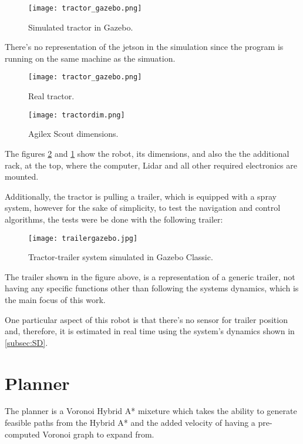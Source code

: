 \begin{figure}[h]
    \centering
    \texttt{[image: tractor\_gazebo.png]}
    \caption{Simulated tractor in Gazebo.}
\end{figure}

There's no representation of the jetson in the simulation since the program is running on 
the same machine as the simuation.
\begin{figure}[h]
    \centering
    \texttt{[image: tractor\_gazebo.png]}
    \caption{Real tractor.}
    \label{fig:tractor}
\end{figure}

 
\begin{figure}[h]
    \centering
    \texttt{[image: tractordim.png]}
    \caption{Agilex Scout dimensions.}
    \label{fig:tractordim}
\end{figure}

The figures \ref{fig:tractordim} and \ref{fig:tractor} show the robot, its dimensions, and also the 
the additional rack, at the top, where the computer, Lidar and all other required electronics 
are mounted.

Additionally, the tractor is pulling a trailer, which is equipped with 
a spray system, however for the sake of simplicity, to test the navigation 
and control algorithms, the tests were be done with the following trailer:
\begin{figure}[h]
    \centering
    \texttt{[image: trailergazebo.jpg]}
    \caption{Tractor-trailer system simulated in Gazebo Classic.}
\end{figure}

The trailer shown in the figure above, is a representation of a generic trailer, not having any specific 
functions other than following the systems dynamics, which is the main focus of this work.

One particular aspect of this robot is that there's no sensor for 
trailer position and, therefore, it is estimated in real time using the 
system's dynamics shown in \ref{subsec:SD}.

\section{Planner}
\label{sec:planner1}
The planner is a Voronoi Hybrid A* mixeture which takes the 
ability to generate feasible paths from the Hybrid A* and the 
added velocity of having a pre-computed Voronoi graph to expand 
from.

